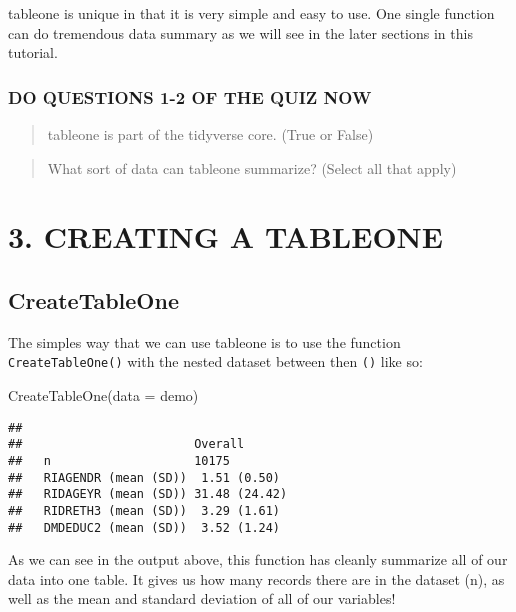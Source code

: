 \documentclass[
]{book}
\newenvironment{Shaded}{\begin{snugshade}}{\end{snugshade}}
\newcommand{\AttributeTok}[1]{\textcolor[rgb]{0.77,0.63,0.00}{#1}}
\newcommand{\FunctionTok}[1]{\textcolor[rgb]{0.00,0.00,0.00}{#1}}
\newcommand{\NormalTok}[1]{#1}
\begin{document}
tableone is unique in that it is very simple and easy to use. One single function can do tremendous data summary as we will see in the later sections in this tutorial.

\hypertarget{do-questions-1-2-of-the-quiz-now}{%
\subsubsection{DO QUESTIONS 1-2 OF THE QUIZ NOW}\label{do-questions-1-2-of-the-quiz-now}}

\begin{quote}
tableone is part of the tidyverse core. (True or False)
\end{quote}

\begin{quote}
What sort of data can tableone summarize? (Select all that apply)
\end{quote}

\hypertarget{creating-a-tableone}{%
\section{3. CREATING A TABLEONE}\label{creating-a-tableone}}

\hypertarget{createtableone}{%
\subsection{CreateTableOne}\label{createtableone}}

The simples way that we can use tableone is to use the function \texttt{CreateTableOne()} with the nested dataset between then \texttt{()} like so:

\begin{Shaded}
\begin{Highlighting}[]
\FunctionTok{CreateTableOne}\NormalTok{(}\AttributeTok{data =}\NormalTok{ demo)}
\end{Highlighting}
\end{Shaded}

\begin{verbatim}
##
##                        Overall
##   n                    10175
##   RIAGENDR (mean (SD))  1.51 (0.50)
##   RIDAGEYR (mean (SD)) 31.48 (24.42)
##   RIDRETH3 (mean (SD))  3.29 (1.61)
##   DMDEDUC2 (mean (SD))  3.52 (1.24)
\end{verbatim}

As we can see in the output above, this function has cleanly summarize all of our data into one table. It gives us how many records there are in the dataset (n), as well as the mean and standard deviation of all of our variables!
\end{document}
